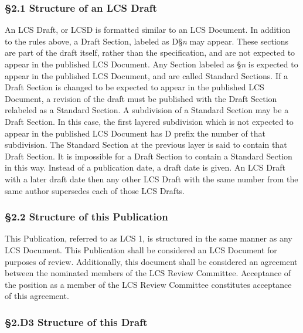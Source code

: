 \documentclass[
]{article}
\begin{document}
\hypertarget{structure-of-an-lcs-draft}{%
\subsubsection{§2.1 Structure of an LCS
Draft}\label{structure-of-an-lcs-draft}}

An LCS Draft, or LCSD is formatted similar to an LCS Document. In
addition to the rules above, a Draft Section, labeled as D§\emph{n} may
appear. These sections are part of the draft itself, rather than the
specification, and are not expected to appear in the published LCS
Document. Any Section labeled as §\emph{n} is expected to appear in the
published LCS Document, and are called Standard Sections. If a Draft
Section is changed to be expected to appear in the published LCS
Document, a revision of the draft must be published with the Draft
Section relabeled as a Standard Section. A subdivision of a Standard
Section may be a Draft Section. In this case, the first layered
subdivision which is not expected to appear in the published LCS
Document has D prefix the number of that subdivision. The Standard
Section at the previous layer is said to contain that Draft Section. It
is impossible for a Draft Section to contain a Standard Section in this
way. Instead of a publication date, a draft date is given. An LCS Draft with a
later draft date then any other LCS Draft with the same number from the same
author supersedes each of those LCS Drafts.

\hypertarget{structure-of-this-publication}{%
\subsubsection{§2.2 Structure of this
Publication}\label{structure-of-this-publication}}

This Publication, referred to as LCS 1, is structured in the same manner
as any LCS Document. This Publication shall be considered an LCS
Document for purposes of review. Additionally, this document shall be
considered an agreement between the nominated members of the LCS Review
Committee. Acceptance of the position as a member of the LCS Review
Committee constitutes acceptance of this agreement.

\hypertarget{d3-structure-of-this-draft}{%
\subsubsection{§2.D3 Structure of this
Draft}\label{d3-structure-of-this-draft}}
\end{document}
